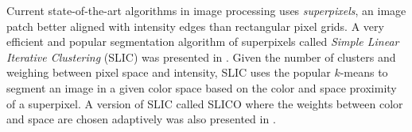 \documentclass[review]{elsarticle}
\begin{document}
Current state-of-the-art algorithms in image processing uses \emph{superpixels}, an image patch better aligned with intensity edges than rectangular pixel grids. A very efficient and popular segmentation algorithm of superpixels called \emph{Simple Linear Iterative Clustering} (SLIC) was presented in \cite{achanta}. Given the number of clusters and weighing between pixel space and intensity, SLIC uses the popular $k$-means to segment an image in a given color space based on the color and space proximity of a superpixel. A version of SLIC  called SLICO where the weights between color and space are chosen adaptively was also presented in \cite{achanta}.
\begin{figure}[h!]
\centering
\begin{minipage}{.5\linewidth}
\centering
{}
\end{minipage}%
\begin{minipage}{.5\linewidth}
\centering
{}

\end{minipage}
\end{figure}
\end{document}

